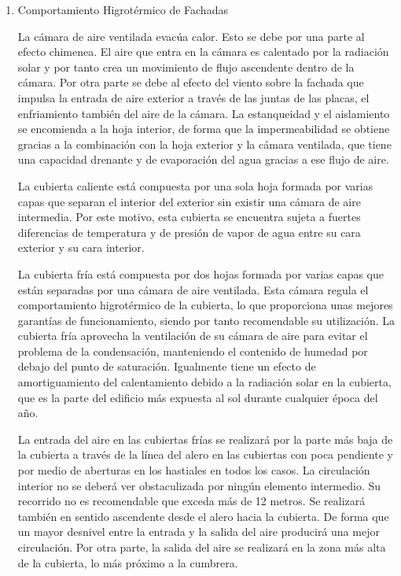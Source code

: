 \begin{enumerate}
Surgen así la fachada ventilada o transventilada y también lo que llamaremos la cubierta fría o ventilada.

    \item Comportamiento Higrotérmico de Fachadas
    
La cámara de aire ventilada evacúa calor. Esto se debe por una parte al efecto chimenea. El aire que entra en la cámara es calentado por la radiación solar y por tanto crea un movimiento de flujo ascendente dentro de la cámara. Por otra parte se debe al efecto del viento sobre la fachada que impulsa la entrada de aire exterior a través de las juntas de las placas, el enfriamiento también del aire de la cámara. La estanqueidad y el aislamiento se encomienda a la hoja interior, de forma que la impermeabilidad se obtiene gracias a la combinación con la hoja exterior y la cámara ventilada, que tiene una capacidad drenante y de evaporación del agua gracias a ese flujo de aire.  

La cubierta caliente está compuesta por una sola hoja formada por varias capas que separan el interior del exterior sin existir una cámara de aire intermedia. Por este motivo, esta cubierta se encuentra sujeta a fuertes diferencias de temperatura y de presión de vapor de agua entre su cara exterior y su cara interior.  

La cubierta fría está compuesta por dos hojas formada por varias capas que están separadas por una cámara de aire ventilada. Esta cámara regula el comportamiento higrotérmico de la cubierta, lo que proporciona unas mejores garantías de funcionamiento, siendo por tanto recomendable su utilización. La cubierta fría aprovecha la ventilación de su cámara de aire para evitar el problema de la condensación, manteniendo el contenido de humedad por debajo del punto de saturación. Igualmente tiene un efecto de amortiguamiento del calentamiento debido a la radiación solar en la cubierta, que es la parte del edificio más expuesta al sol durante cualquier época del año.

La entrada del aire en las cubiertas frías se realizará por la parte más baja de la cubierta a través de la línea del alero en las cubiertas con poca pendiente y por medio de aberturas en los hastiales en todos los casos. La circulación interior no se deberá ver obstaculizada por ningún elemento intermedio. Su recorrido no es recomendable que exceda más de 12 metros. Se realizará también en sentido ascendente desde el alero hacia la cubierta. De forma que un mayor desnivel entre la entrada y la salida del aire producirá una mejor circulación. Por otra parte, la salida del aire se realizará en la zona más alta de la cubierta, lo más próximo a la cumbrera.

\end{enumerate}

